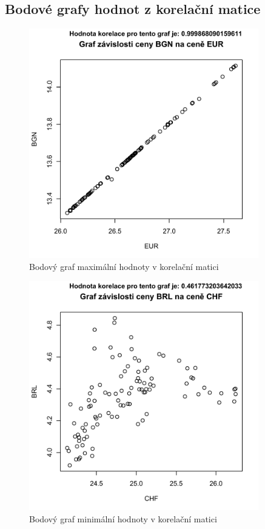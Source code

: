 \documentclass[a4paper]{ article}
\begin{document}
\subsection{Bodové grafy hodnot z korelační matice}
\begin{figure}[H]
\centering
\includegraphics[width=10cm]{cor_max.pdf}
\caption{Bodový graf maximální hodnoty v korelační matici}
\end{figure}
\begin{figure}[H]
\centering
\includegraphics[width=10cm]{cor_min.pdf}
\caption{Bodový graf minimální hodnoty v korelační matici}
\end{figure}
\clearpage

\end{document}
